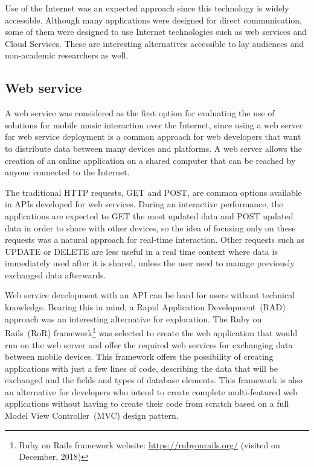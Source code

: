 Use of the Internet was an expected approach since this technology is widely accessible.
Although many applications were designed for direct communication, some of them were designed to use Internet technologies such as web services and Cloud Services. These are interesting alternatives accessible to lay audiences and non-academic researchers as well.

\subsection*{Web service}
 
A web service was considered as the first option for evaluating the use of solutions for mobile music interaction over the Internet, since
using a web server for web service deployment is a common approach for web developers that want to distribute data between many devices and platforms.
A web server allows the creation of an online application on a shared computer that can be reached by anyone connected to the Internet.

The traditional HTTP requests, GET and POST, are common options available in APIs developed for web services.
During an interactive performance, the applications are expected to GET the most updated data and POST updated data in order to share with other devices, so the idea of focusing only on these requests was a natural approach for real-time interaction.
Other requests such as UPDATE or DELETE are less useful in a real time context where data is immediately used after it is shared, unless the user need to manage previously exchanged data afterwards.

Web service development with an API can be hard for users without technical knowledge.
Bearing this in mind, a Rapid Application Development~(RAD) approach was an interesting alternative for exploration.
The Ruby on Rails~(RoR) framework\footnote{Ruby on Rails framework website: \url{https://rubyonrails.org/} (visited on December, 2018)} was selected to create the web application that would run on the web server and offer the required web services for exchanging data between mobile devices.
This framework offers the possibility of creating applications with just a few lines of code, describing the data that will be exchanged and the fields and types of database elements.
This framework is also an alternative for developers who intend to create complete multi-featured web applications without having to create their code from scratch based on a full Model View Controller~(MVC) design pattern.


